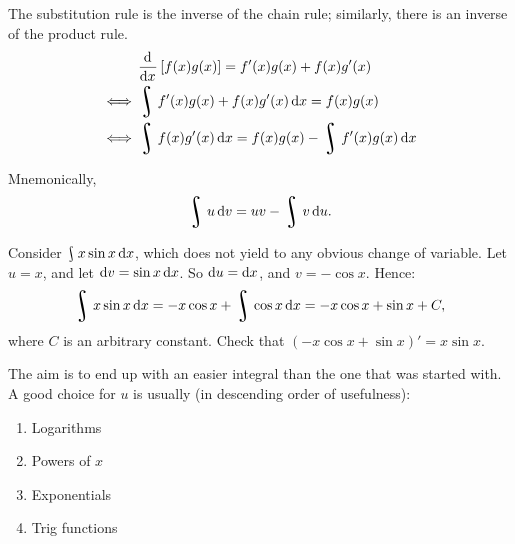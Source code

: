 


The substitution rule is the inverse of the chain rule; similarly, there is an inverse of the product rule.
\begin{align*}
       &\dod{}{x} [f(x) g(x)] = f'(x) g(x) + f(x) g'(x)\\
  \iff &\rint f'(x) g(x) + f(x) g'(x) \dif{x} = f(x) g(x)\\
  \iff &\rint f(x) g'(x) \dif{x} = f(x)g(x) - \rint f'(x) g(x) \dif{x}
\end{align*}

Mnemonically,
\begin{displaymath}
  \rint u \dif{v} = uv - \rint v \dif{u}.
\end{displaymath}

\begin{ex}
Consider $ \rint x \sin x \dif{x} $, which does not yield to any obvious change of variable. Let $ u = x $, and
let $ \dif{v} = \sin x \dif{x} $. So $ \dif{u} = \dif{x} $, and $ v = -\cos x $. Hence:
\begin{displaymath}
  \rint x \sin x \dif{x} = -x\cos x + \rint \cos x \dif{x} = -x\cos x + \sin x + C,
\end{displaymath}
where $ C $ is an arbitrary constant. Check that $ (-x\cos x + \sin x)' = x\sin x $.
\end{ex}

The aim is to end up with an easier integral than the one that was started with. A good choice for $ u $ is usually (in descending
order of usefulness):
\begin{enumerate}
  \item Logarithms
  \item Powers of $ x $
  \item Exponentials
  \item Trig functions
\end{enumerate}

